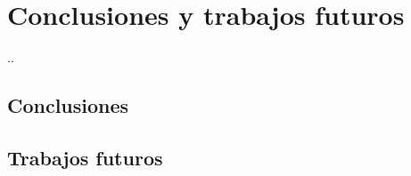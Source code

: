 \chapter{Conclusiones y trabajos futuros}

\bigskip
..

\newpage
\section{Conclusiones}




\section{Trabajos futuros}








